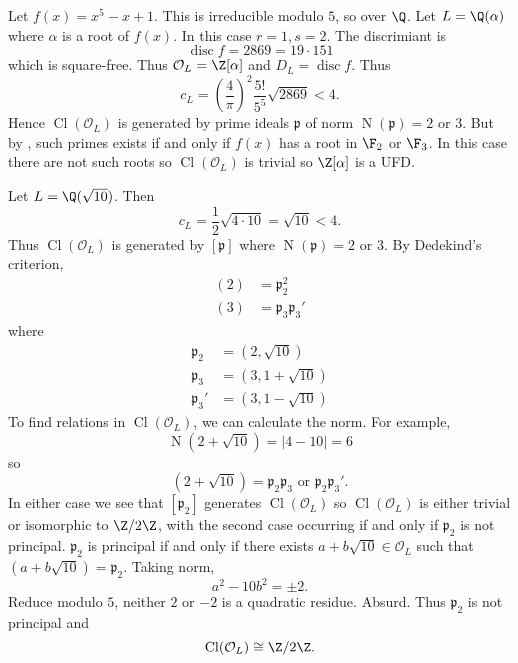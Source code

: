 \documentclass[a4paper]{article}
\renewcommand*{\O}{\mathcal{O}}
\DeclareMathOperator{\n}{N}
\DeclareMathOperator{\disc}{disc}
\DeclareMathOperator{\Cl}{Cl}%
\begin{document}
\begin{eg}\leavevmode
  Let \(f(x) = x^5 - x + 1\). This is irreducible modulo \(5\), so over \(\Q\). Let \(L = \Q(\alpha)\) where \(\alpha\) is a root of \(f(x)\). In this case \(r = 1, s = 2\). The discrimiant is
  \[
    \disc f = 2869 = 19 \cdot 151
  \]
  which is square-free. Thus \(\O_L = \Z[\alpha]\) and \(D_L = \disc f\). Thus
  \[
    c_L = \left( \frac{4}{\pi} \right)^2 \frac{5!}{5^5} \sqrt{2869} < 4.
  \]
  Hence \(\Cl(\O_L)\) is generated by prime ideals \(\mathfrak{p}\) of norm \(\n(\mathfrak{p}) = 2\) or \(3\). But by , such primes exists if and only if \(f(x)\) has a root in \(\F_2\) or \(\F_3\). In this case there are not such roots so \(\Cl(\O_L)\) is trivial so \(\Z[\alpha]\) is a UFD.
\end{eg}

\begin{eg}
  Let \(L = \Q(\sqrt{10})\). Then
  \[
    c_L = \frac{1}{2} \sqrt{4 \cdot 10} = \sqrt{10} < 4.
  \]
  Thus \(\Cl(\O_L)\) is generated by \([\mathfrak{p}]\) where \(\n(\mathfrak{p}) = 2\) or \(3\). By Dedekind's criterion,
  \begin{align*}
    (2) &= \mathfrak p_2^2 \\
    (3) &= \mathfrak p_3 \mathfrak p_3'
  \end{align*}
  where
  \begin{align*}
    \mathfrak p_2 &= (2, \sqrt{10}) \\
    \mathfrak p_3 &= (3, 1 + \sqrt{10}) \\
    \mathfrak p_3' &= (3, 1 - \sqrt{10})
  \end{align*}
  To find relations in \(\Cl(\O_L)\), we can calculate the norm. For example,
  \[
    \n(2 + \sqrt{10}) = |4 - 10| = 6
  \]
  so
  \[
    (2 + \sqrt{10}) = \mathfrak p_2 \mathfrak p_3 \text{ or } \mathfrak p_2 \mathfrak p_3'.
  \]
  In either case we see that \([\mathfrak p_2]\) generates \(\Cl(\O_L)\) so \(\Cl(\O_L)\) is either trivial or isomorphic to \(\Z/2\Z\), with the second case occurring if and only if \(\mathfrak p_2\) is not principal. \(\mathfrak p_2\) is principal if and only if there exists \(a + b \sqrt{10} \in \O_L\) such that \((a + b \sqrt{10}) = \mathfrak p_2\). Taking norm,
  \[
    a^2 - 10b^2 = \pm 2.
  \]
  Reduce modulo \(5\), neither \(2\) or \(-2\) is a quadratic residue. Absurd. Thus \(\mathfrak p_2\) is not principal and
  \[
    \Cl(\O_L) \cong \Z/2\Z.
  \]
\end{eg}
\end{document}
